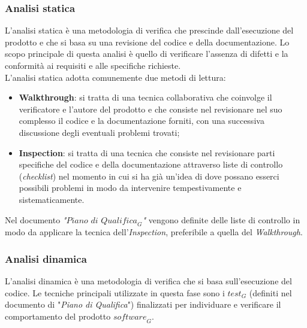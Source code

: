\subsubsection{Analisi statica}
L'analisi statica è una metodologia di verifica che prescinde dall'esecuzione del prodotto e che si basa su una revisione del codice e della documentazione. Lo scopo principale di questa analisi è quello di verificare l'assenza di difetti e la conformità ai requisiti e alle specifiche richieste. \\
L'analisi statica adotta comunemente due metodi di lettura:
\begin{itemize}
    \item \textbf{Walkthrough}: si tratta di una tecnica collaborativa che coinvolge il verificatore e l'autore del prodotto e che consiste nel revisionare nel suo complesso il codice e la documentazione forniti, con una successiva discussione degli eventuali problemi trovati;
    \item \textbf{Inspection}: si tratta di una tecnica che consiste nel revisionare parti specifiche del codice e della documentazione attraverso liste di controllo (\emph{checklist}) nel momento in cui si ha già un'idea di dove possano esserci possibili problemi in modo da intervenire tempestivamente e sistematicamente.
\end{itemize}
Nel documento \emph{"$\textit{Piano di Qualifica}_G$"} vengono definite delle liste di controllo in modo da applicare la tecnica dell'\textit{Inspection}, preferibile a quella del \textit{Walkthrough}.
\subsubsection{Analisi dinamica}
L'analisi dinamica è una metodologia di verifica che si basa sull'esecuzione del codice. Le tecniche principali utilizzate in questa fase sono i $\textit{test}_G$ (definiti nel documento di "\emph{Piano di Qualifica}") finalizzati per individuare e verificare il comportamento del prodotto $\textit{software}_G$.

